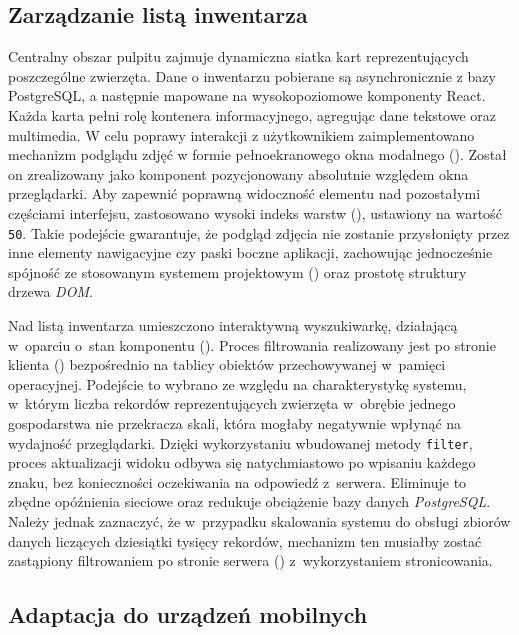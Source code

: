 \subsection{Zarządzanie listą inwentarza}

Centralny obszar pulpitu zajmuje dynamiczna siatka kart reprezentujących poszczególne zwierzęta. Dane o inwentarzu pobierane są asynchronicznie z bazy PostgreSQL, a następnie mapowane na wysokopoziomowe komponenty React. Każda karta pełni rolę kontenera informacyjnego, agregując dane tekstowe oraz multimedia. W celu poprawy interakcji z użytkownikiem zaimplementowano mechanizm podglądu zdjęć w formie pełnoekranowego okna modalnego (). Został on zrealizowany jako komponent pozycjonowany absolutnie względem okna przeglądarki. Aby zapewnić poprawną widoczność elementu nad pozostałymi częściami interfejsu, zastosowano wysoki indeks warstw (), ustawiony na wartość \texttt{50}. Takie podejście gwarantuje, że podgląd zdjęcia nie zostanie przysłonięty przez inne elementy nawigacyjne czy paski boczne aplikacji, zachowując jednocześnie spójność ze stosowanym systemem projektowym () oraz prostotę struktury drzewa \textit{DOM}.

Nad listą inwentarza umieszczono interaktywną wyszukiwarkę, działającą w~oparciu o~stan komponentu (). Proces filtrowania realizowany jest po stronie klienta () bezpośrednio na tablicy obiektów przechowywanej w~pamięci operacyjnej. Podejście to wybrano ze względu na charakterystykę systemu, w~którym liczba rekordów reprezentujących zwierzęta w~obrębie jednego gospodarstwa nie przekracza skali, która mogłaby negatywnie wpłynąć na wydajność przeglądarki. Dzięki wykorzystaniu wbudowanej metody \texttt{filter}, proces aktualizacji widoku odbywa się natychmiastowo po wpisaniu każdego znaku, bez konieczności oczekiwania na odpowiedź z~serwera. Eliminuje to zbędne opóźnienia sieciowe oraz redukuje obciążenie bazy danych \textit{PostgreSQL}. Należy jednak zaznaczyć, że w~przypadku skalowania systemu do obsługi zbiorów danych liczących dziesiątki tysięcy rekordów, mechanizm ten musiałby zostać zastąpiony filtrowaniem po stronie serwera () z~wykorzystaniem stronicowania.

\subsection{Adaptacja do urządzeń mobilnych}


